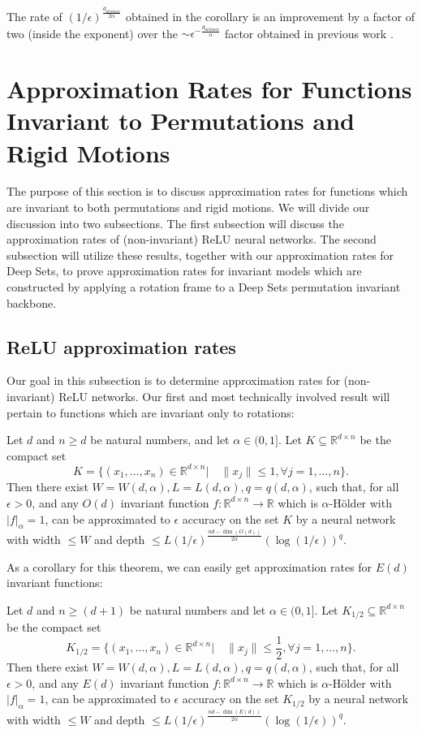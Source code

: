 \documentclass[twoside,11pt]{article}
\newcommand{\RR}{\mathbb{R}}
\begin{document}
 The rate of $(1/\epsilon)^{\frac{d_{\text{intrinsic}}}{2\alpha}} $ obtained in the corollary  is an improvement by a factor of two (inside the exponent) over the $\sim \epsilon^{-\frac{d_{\text{intrinsic}}}{\alpha}}$ factor obtained in previous work \cite{nakada2020adaptive}. 

\section{Approximation Rates for Functions Invariant to Permutations and Rigid Motions}\label{sec:rotation} %
The purpose of this section is to discuss approximation rates for functions which are invariant to both permutations and rigid motions. We will divide our discussion into two subsections. The first subsection will discuss the approximation rates of (non-invariant) ReLU neural networks. The second subsection will utilize these results, together with our approximation rates for Deep Sets,  to prove approximation rates for invariant models which are constructed by applying a rotation frame to a Deep Sets permutation invariant  backbone. 
\subsection{ReLU approximation rates}
Our goal in this subsection is to determine approximation rates for (non-invariant) ReLU networks. Our first and most technically involved result will pertain to functions which are invariant only to rotations: 
\begin{theorem}\label{thm:reluO}
Let $d$ and $n\geq d$ be natural numbers, and let $\alpha \in (0,1] $. Let $K\subseteq \RR^{d\times n}$ be the compact set 
$$K=\{(x_1,\ldots,x_n)\in \RR^{d\times n}| \quad \|x_j\| \leq 1, \forall j=1,\ldots,n\} .$$
Then there exist $W=W(d,\alpha),L=L(d,\alpha),q=q(d,\alpha)$, such that, for all $\epsilon>0$, and any  $O(d)$ invariant function $f:\RR^{d\times n}\to \RR$ which is $\alpha$-H\"older with $|f|_\alpha=1$, can be approximated to $\epsilon$ accuracy on the set $K$ by a neural network with width $\leq W$ and depth $\leq L(1/\epsilon)^{\frac{nd-\dim(O(d))}{2\alpha}}\left(\log(1/\epsilon)\right)^q$. 
\end{theorem}
As a corollary for this theorem, we can easily get approximation rates for $E(d)$  invariant functions:

\begin{cor}\label{cor:reluE}
Let $d$ and $n\geq (d+1)$ be natural numbers and let $\alpha\in (0,1] $. Let $K_{1/2}\subseteq \RR^{d\times n}$ be the compact set 
$$K_{1/2}=\{(x_1,\ldots,x_n)\in \RR^{d\times n}| \quad \|x_j\| \leq \frac{1}{2}, \forall j=1,\ldots,n\} .$$
Then there exist $W=W(d,\alpha),L=L(d,\alpha),q=q(d,\alpha)$, such that, for all $\epsilon>0$, and any $E(d)$ invariant function $f:\RR^{d\times n} \to \RR $ which is $\alpha$-H\"older with $|f|_\alpha=1 $,  can be approximated to $\epsilon$ accuracy on the set $K_{1/2}$ by a neural network with width $\leq W$ and depth $\leq L(1/\epsilon)^{\frac{nd-\dim(E(d))}{2\alpha}}\left(\log(1/\epsilon)\right)^q$.
\end{cor}
\end{document}
